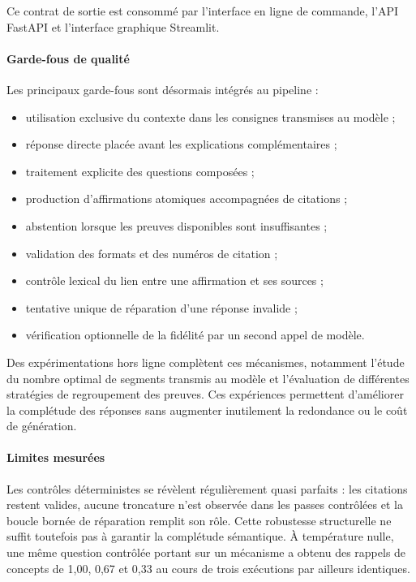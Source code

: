 Ce contrat de sortie est consommé par l'interface en ligne de commande, l'API FastAPI
et l'interface graphique Streamlit.

\paragraph{Garde-fous de qualité}

Les principaux garde-fous sont désormais intégrés au pipeline :

\begin{itemize}
  \item utilisation exclusive du contexte dans les consignes transmises au modèle ;
  \item réponse directe placée avant les explications complémentaires ;
  \item traitement explicite des questions composées ;
  \item production d'affirmations atomiques accompagnées de citations ;
  \item abstention lorsque les preuves disponibles sont insuffisantes ;
  \item validation des formats et des numéros de citation ;
  \item contrôle lexical du lien entre une affirmation et ses sources ;
  \item tentative unique de réparation d'une réponse invalide ;
  \item vérification optionnelle de la fidélité par un second appel de modèle.
\end{itemize}

Des expérimentations hors ligne complètent ces mécanismes, notamment l'étude du nombre
optimal de segments transmis au modèle et l'évaluation de différentes stratégies de
regroupement des preuves. Ces expériences permettent d'améliorer la complétude des
réponses sans augmenter inutilement la redondance ou le coût de génération.

\paragraph{Limites mesurées}

Les contrôles déterministes se révèlent régulièrement quasi parfaits : les citations
restent valides, aucune troncature n'est observée dans les passes contrôlées et la
boucle bornée de réparation remplit son rôle. Cette robustesse structurelle ne suffit
toutefois pas à garantir la complétude sémantique. À température nulle, une même
question contrôlée portant sur un mécanisme a obtenu des rappels de concepts de
1,00, 0,67 et 0,33 au cours de trois exécutions par ailleurs identiques.

